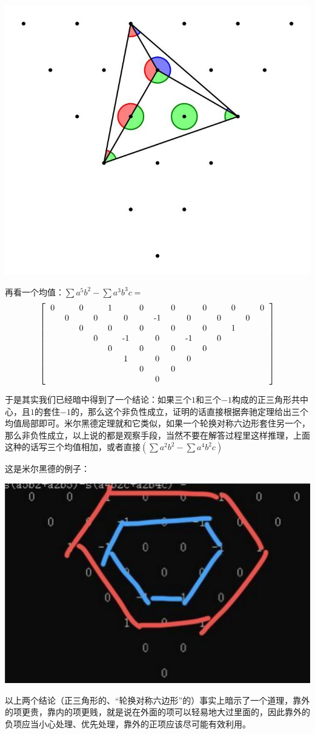 \documentclass[UTF8]{ctexart}
\begin{document}
\begin{center}
	\includegraphics[width=0.4\linewidth]{14}
\end{center}

再看一个均值：$ \displaystyle  \sum a^{5}b^{2}-\displaystyle  \sum a^{3}b^{3}c= $
\renewcommand*{\arraystretch}{1.732}\[\left[\begin{matrix}
	\begin{tabular}{ccccccccccccccc}
		0& &0& &1& &0& &0& &0& &0& &0\\
		&0& &0& &0& &-1& &0& &0& &0&\\
		& &0& &0& &0& &0& &0& &1& &\\
		& & &0& &-1& &0& &-1& &0& & &\\
		& & & &0& &0& &0& &0& & & &\\
		& & & & &1& &0& &0& & & & &\\
		& & & & & &0& &0& & & & & &\\
		& & & & & & &0& & & & & & &\\
	\end{tabular}
\end{matrix}\right]\]


于是其实我们已经暗中得到了一个结论：如果三个$ 1 $和三个$ -1 $构成的正三角形共中心，且$ 1 $的套住$ -1 $的，那么这个非负性成立，证明的话直接根据奔驰定理给出三个均值局部即可。米尔黑德定理就和它类似，如果一个轮换对称六边形套住另一个，那么非负性成立，以上说的都是观察手段，当然不要在解答过程里这样推理，上面这种的话写三个均值相加，或者直接$ (\displaystyle \sum a^{2}b^{2}-\displaystyle \sum a^{4}b^{2}c) $

这是米尔黑德的例子：
\begin{center}
	\includegraphics[width=0.45\linewidth]{16}
\end{center}
以上两个结论（正三角形的、“轮换对称六边形”的）事实上暗示了一个道理，靠外的项更贵，靠内的项更贱，就是说在外面的项可以轻易地大过里面的，因此靠外的负项应当小心处理、优先处理，靠外的正项应该尽可能有效利用。\\
\end{document}
